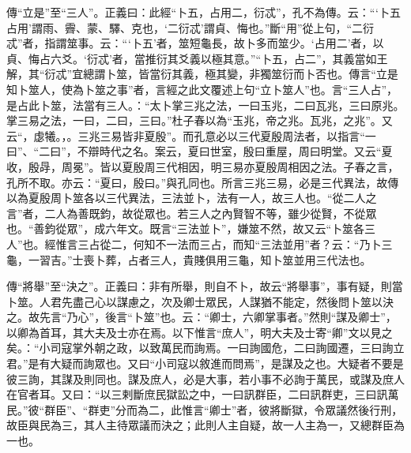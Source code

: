 {\noindent\zhuan{}\fzbyks 傳“立是”至“三人”。正義曰：此經“卜五，占用二，衍忒”，孔不為傳。云：“‘卜五占用’謂雨、霽、蒙、驛、克也，‘二衍忒’謂貞、悔也。”斷“用”從上句，“二衍忒”者，指謂筮事。云：“‘卜五’者，筮短龜長，故卜多而筮少。‘占用二’者，以貞、悔占六爻。‘衍忒’者，當推衍其爻義以極其意。”“卜五，占二”，其義當如王解，其“衍忒”宜總謂卜筮，皆當衍其義，極其變，非獨筮衍而卜否也。傳言“立是知卜筮人，使為卜筮之事”者，言經之此文覆述上句“立卜筮人”也。言“三人占”，是占此卜筮，法當有三人。：“太卜掌三兆之法，一曰玉兆，二曰瓦兆，三曰原兆。掌三易之法，一曰，二曰，三曰。”杜子春以為“玉兆，帝之兆。瓦兆，之兆”。又云“，虙犧。，。三兆三易皆非夏殷”。而孔意必以三代夏殷周法者，以指言“一曰”、“二曰”，不辯時代之名。案云，夏曰世室，殷曰重屋，周曰明堂。又云“夏收，殷冔，周冕”。皆以夏殷周三代相因，明三易亦夏殷周相因之法。子春之言，孔所不取。亦云：“夏曰，殷曰。”與孔同也。所言三兆三易，必是三代異法，故傳以為夏殷周卜筮各以三代異法，三法並卜，法有一人，故三人也。“從二人之言”者，二人為善既鈞，故從眾也。若三人之內賢智不等，雖少從賢，不從眾也。“善鈞從眾”，成六年文。既言“三法並卜”，嫌筮不然，故又云“卜筮各三人”也。經惟言三占從二，何知不一法而三占，而知“三法並用”者？云：“乃卜三龜，一習吉。”士喪卜葬，占者三人，貴賤俱用三龜，知卜筮並用三代法也。 \par}

{\noindent\zhuan{}\fzbyks 傳“將舉”至“決之”。正義曰：非有所舉，則自不卜，故云“將舉事”，事有疑，則當卜筮。人君先盡己心以謀慮之，次及卿士眾民，人謀猶不能定，然後問卜筮以決之。故先言“乃心”，後言“卜筮”也。云：“卿士，六卿掌事者。”然則“謀及卿士”，以卿為首耳，其大夫及士亦在焉。以下惟言“庶人”，明大夫及士寄“卿”文以見之矣。：“小司寇掌外朝之政，以致萬民而詢焉。一曰詢國危，二曰詢國遷，三曰詢立君。”是有大疑而詢眾也。又曰“小司寇以敘進而問焉”，是謀及之也。大疑者不要是彼三詢，其謀及則同也。謀及庶人，必是大事，若小事不必詢于萬民，或謀及庶人在官者耳。又曰：“以三剌斷庶民獄訟之中，一曰訊群臣，二曰訊群吏，三曰訊萬民。”彼“群臣”、“群吏”分而為二，此惟言“卿士”者，彼將斷獄，令眾議然後行刑，故臣與民為三，其人主待眾議而決之；此則人主自疑，故一人主為一，又總群臣為一也。 \par}

